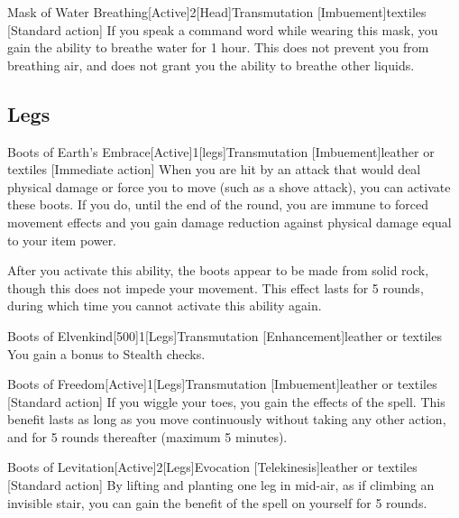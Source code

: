         \begin{magicitemdef}{Mask of Water Breathing}[Active]{2}[Head]{Transmutation [Imbuement]}{textiles}
            [Standard action] If you speak a command word while wearing this mask, you gain the ability to breathe water for 1 hour.
            This does not prevent you from breathing air, and does not grant you the ability to breathe other liquids.
        \end{magicitemdef}

    \subsection{Legs}

        \begin{magicitemdef}{Boots of Earth's Embrace}[Active]{1}[legs]{Transmutation [Imbuement]}{leather or textiles}
            [Immediate action] When you are hit by an attack that would deal physical damage or force you to move (such as a shove attack), you can activate these boots.
            If you do, until the end of the round, you are immune to forced movement effects and you gain damage reduction against physical damage equal to your item power.

            After you activate this ability, the boots appear to be made from solid rock, though this does not impede your movement.
            This effect lasts for 5 rounds, during which time you cannot activate this ability again.
        \end{magicitemdef}

        \begin{magicitemdef}{Boots of Elvenkind}[500]{1}[Legs]{Transmutation [Enhancement]}{leather or textiles}
             You gain a  bonus to Stealth checks.
        \end{magicitemdef}

        \begin{magicitemdef}{Boots of Freedom}[Active]{1}[Legs]{Transmutation [Imbuement]}{leather or textiles}
            [Standard action] If you wiggle your toes, you gain the effects of the  spell.
            This benefit lasts as long as you move continuously without taking any other action, and for 5 rounds thereafter (maximum 5 minutes).
        \end{magicitemdef}

        \begin{magicitemdef}{Boots of Levitation}[Active]{2}[Legs]{Evocation [Telekinesis]}{leather or textiles}
            [Standard action] By lifting and planting one leg in mid-air, as if climbing an invisible stair, you can gain the benefit of the  spell on yourself for 5 rounds.
        \end{magicitemdef}

